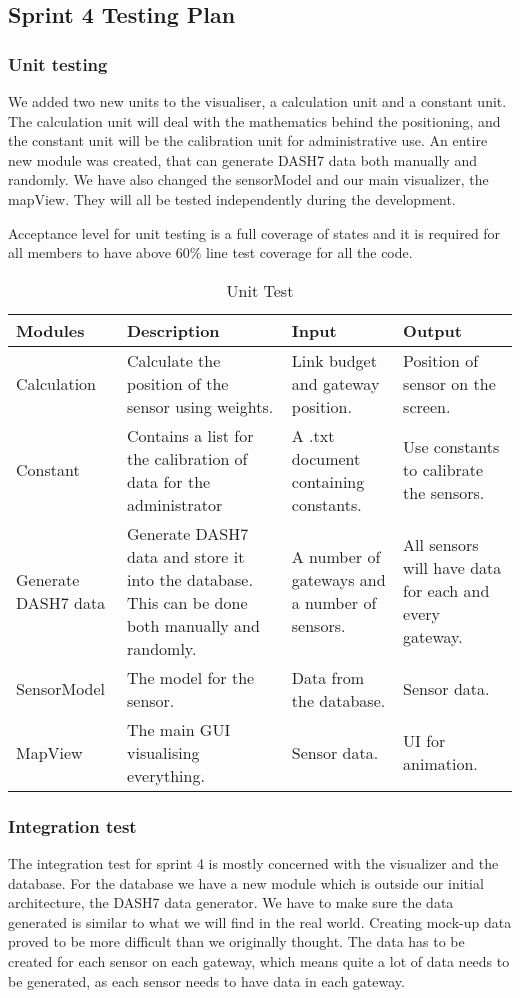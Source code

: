 \documentclass[../document]{subfiles}
\begin{document}
\subsection{Sprint 4 Testing Plan}
\label{test_plan_sprint_4}

\subsubsection{Unit testing}
We added two new units to the visualiser, a calculation unit and a constant unit. The calculation unit will deal with the mathematics behind the positioning, and the constant unit will be the calibration unit for administrative use. An entire new module was created, that can generate \gls{DASH7} data both manually and randomly. We have also changed the sensorModel and our main visualizer, the mapView. They will all be tested independently during the development. 

Acceptance level for unit testing is a full coverage of states and it is required for all members to have above 60\% line test coverage for all the code.

\begin{table}[H]
\caption{Unit Test}
\centering
\begin{tabularx}{\textwidth}{|X|X|X|X|}
	\hline
	Modules
	&Description
	&Input
	&Output
	\\ \hline Calculation
	&Calculate the position of the sensor using weights.
	&Link budget and gateway position.
	&Position of sensor on the screen.
	\\ \hline Constant
	&Contains a list for the calibration of data for the administrator
	&A .txt document containing constants.
	&Use constants to calibrate the sensors.
	\\ \hline Generate \gls{DASH7} data
	&Generate \gls{DASH7} data and store it into the database. This can be done both manually and randomly. 
	&A number of gateways and a number of sensors.
	&All sensors will have data for each and every gateway.
	\\ \hline SensorModel
	&The model for the sensor.
	&Data from the database.
	&Sensor data.
	\\ \hline MapView
	&The main GUI visualising everything.
	&Sensor data.
	&UI for animation.
	\\ \hline 
\end{tabularx}
\end{table}

\subsubsection{Integration test}
The integration test for sprint 4 is mostly concerned with the visualizer and the database. For the database we have a new module which is outside our initial architecture, the \gls{DASH7} data generator. We have to make sure the data generated is similar to what we will find in the real world. Creating mock-up data proved to be more difficult than we originally thought. The data has to be created for each sensor on each gateway, which means quite a lot of data needs to be generated, as each sensor needs to have data in each gateway. 
\end{document}
